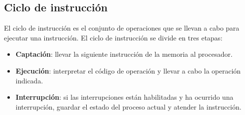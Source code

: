 \subsection{Ciclo de instrucción}

El ciclo de instrucción es el conjunto de operaciones que se llevan a cabo para ejecutar una instrucción. El ciclo de instrucción se divide en tres etapas:

\begin{itemize}
  \item \textbf{Captación}: llevar la siguiente instrucción de la memoria al procesador.
  \item \textbf{Ejecución}: interpretar el código de operación y llevar a cabo la operación indicada.
  \item \textbf{Interrupción}: si las interrupciones están habilitadas y ha ocurrido una interrupción, guardar el estado del proceso actual y atender la instrucción.
\end{itemize}